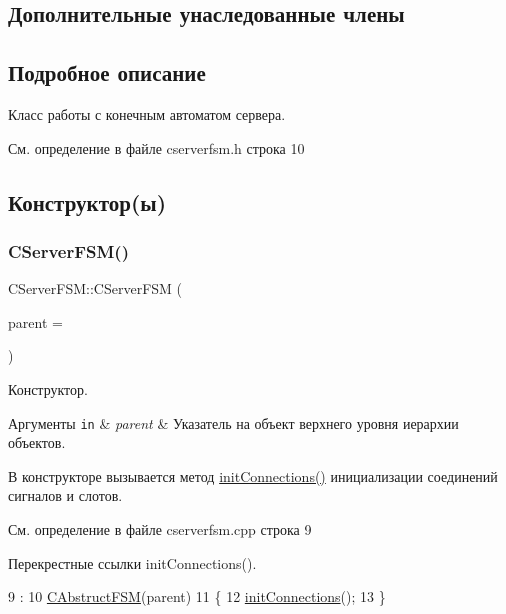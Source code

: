 \subsection*{Дополнительные унаследованные члены}


\subsection{Подробное описание}
Класс работы с конечным автоматом сервера. 

См. определение в файле cserverfsm.\+h строка 10



\subsection{Конструктор(ы)}
\hypertarget{class_c_server_f_s_m_a6d2328de2b1e2725e4a569e146b077f3}{}\label{class_c_server_f_s_m_a6d2328de2b1e2725e4a569e146b077f3} 
\subsubsection{\texorpdfstring{C\+Server\+F\+S\+M()}{CServerFSM()}}
{\footnotesize\ttfamily C\+Server\+F\+S\+M\+::\+C\+Server\+F\+SM (\begin{DoxyParamCaption}\item[{Q\+Object $\ast$}]{parent = {} }\end{DoxyParamCaption})}



Конструктор. 


\begin{DoxyParams}[1]{Аргументы}
\mbox{\tt in}  & {\em parent} & Указатель на объект верхнего уровня иерархии объектов.\\
\hline
\end{DoxyParams}
В конструкторе вызывается метод \hyperlink{class_c_server_f_s_m_ae0e6a994505c26e60b718af9989bea77}{init\+Connections()} инициализации соединений сигналов и слотов. 

См. определение в файле cserverfsm.\+cpp строка 9



Перекрестные ссылки init\+Connections().


\begin{DoxyCode}
9                                       :
10     \hyperlink{class_c_abstruct_f_s_m_a54037c986f6b437c50d5e8ba42063330}{CAbstructFSM}(parent)
11 \{
12     \hyperlink{class_c_server_f_s_m_ae0e6a994505c26e60b718af9989bea77}{initConnections}();
13 \}
\end{DoxyCode}
\hypertarget{class_c_server_f_s_m_a33dcbbf4680177c3f5769171f9516e8c}{}\label{class_c_server_f_s_m_a33dcbbf4680177c3f5769171f9516e8c} 
